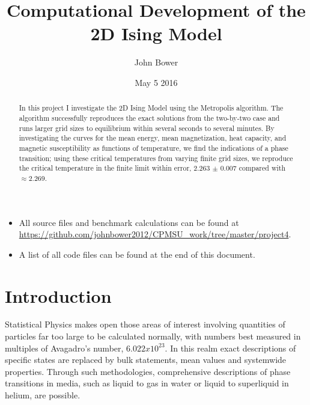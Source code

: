 \documentclass[11pt,a4paper]{article}
\title{Computational Development of the 2D Ising Model}
\author{John Bower}
\date{May 5 2016}
\begin{document}
\maketitle

\begin{abstract}

In this project I investigate the 2D Ising Model using the Metropolis algorithm. The algorithm successfully reproduces the exact solutions from the two-by-two case and runs larger grid sizes to equilibrium within several seconds to several minutes. By investigating the curves for the mean energy, mean magnetization, heat capacity, and magnetic susceptibility as functions of temperature, we find the indications of a phase transition; using these critical temperatures from varying finite grid sizes, we reproduce the critical temperature in the finite limit within error, 2.263 $\pm$ 0.007 compared with $\approx$2.269.

\end{abstract}

\begin{itemize}
\item All source files and benchmark calculations can be found at \url{https://github.com/johnbower2012/CPMSU_work/tree/master/project4}.
\item A list of all code files can be found at the end of this document.
\end{itemize}

\section{Introduction}


Statistical Physics makes open those areas of interest involving quantities of particles far too large to be calculated normally, with numbers best measured in multiples of Avagadro's number, $6.022 x 10^{23}$. In this realm exact descriptions of specific states are replaced by bulk statements, mean values and systemwide properties. Through such methodologies, comprehensive descriptions of phase transitions in media, such as liquid to gas in water or liquid to superliquid in helium, are possible. 
\end{document}
